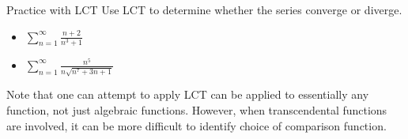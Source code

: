\begin{exercise}{Practice with LCT}
Use LCT to determine whether the series converge or diverge.
\begin{itemize}
\item $\sum_{n=1}^\infty \frac{n+2}{n^3+1}$
\vspace*{2in}
\item  $\sum_{n=1}^\infty \frac{n^5}{n\sqrt{n^7+3n+1}}$
\vspace*{2in} 
\end{itemize} 
\end{exercise}

Note that one can attempt to apply LCT can be applied to essentially any  function, not just algebraic functions.  However, when transcendental functions are involved, it can be more difficult to identify choice of comparison function.

